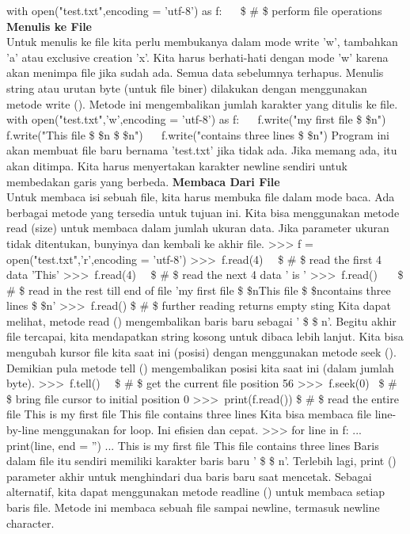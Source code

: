 with open("test.txt",encoding = 'utf-8') as f:  
~~  \$  \#  \$ perform file operations 
{\fontsize{14pt}{14pt}\selectfont \textbf{Menulis ke File} \\} 
Untuk menulis ke file kita perlu membukanya dalam mode write 'w', tambahkan 'a' atau exclusive creation 'x'. Kita harus berhati-hati dengan mode 'w' karena akan menimpa file jika sudah ada. Semua data sebelumnya terhapus. Menulis string atau urutan byte (untuk file biner) dilakukan dengan menggunakan metode write (). Metode ini mengembalikan jumlah karakter yang ditulis ke file.  
with open("test.txt",'w',encoding = 'utf-8') as f: 
~~ f.write("my first file \$  \setminus  \$n")  
~~ f.write("This file \$  \setminus  \$n \$  \setminus  \$n") 
~~ f.write("contains three lines \$  \setminus  \$n")
Program ini akan membuat file baru bernama 'test.txt' jika tidak ada. Jika memang ada, itu akan ditimpa. Kita harus menyertakan karakter newline sendiri untuk membedakan garis yang berbeda. 
{\fontsize{14pt}{14pt}\selectfont \textbf{Membaca Dari File} \\} 
Untuk membaca isi sebuah file, kita harus membuka file dalam mode baca. Ada berbagai metode yang tersedia untuk tujuan ini. Kita bisa menggunakan metode read (size) untuk membaca dalam jumlah ukuran data. Jika parameter ukuran tidak ditentukan, bunyinya dan kembali ke akhir file.  
>>> f = open("test.txt",'r',encoding = 'utf-8')  
>>>~f.read(4)~~   \$  \#  \$ read the first 4 data 
'This' 
>>>~f.read(4)~~   \$  \#  \$ read the next 4 data 
' is '  
>>>~f.read()~~~   \$  \#  \$ read in the rest till end of file  
'my first file \$  \setminus  \$nThis file \$  \setminus  \$ncontains three lines \$  \setminus  \$n' 
>>>~f.read()   \$  \#  \$ further reading returns empty sting 
Kita dapat melihat, metode read () mengembalikan baris baru sebagai ' \$  \setminus  \$ n'. Begitu akhir file tercapai, kita mendapatkan string kosong untuk dibaca lebih lanjut. Kita bisa mengubah kursor file kita saat ini (posisi) dengan menggunakan metode seek (). Demikian pula metode tell () mengembalikan posisi kita saat ini (dalam jumlah byte).  
>>>~f.tell()~~   \$  \#  \$ get the current file position  
56 
>>>~f.seek(0)~   \$  \#  \$ bring file cursor to initial position  
0  
>>>~print(f.read())   \$  \#  \$ read the entire file  
This is my first file  
This file 
contains three lines 
Kita bisa membaca file line-by-line menggunakan for loop. Ini efisien dan cepat. 
>>> for line in f:  
...~~~~ print(line, end = '')  
... 
This is my first file 
This file  
contains three lines 
Baris dalam file itu sendiri memiliki karakter baris baru ' \$  \setminus  \$ n'. Terlebih lagi, print () parameter akhir untuk menghindari dua baris baru saat mencetak. Sebagai alternatif, kita dapat menggunakan metode readline () untuk membaca setiap baris file. Metode ini membaca sebuah file sampai newline, termasuk newline character.
